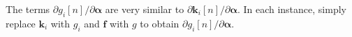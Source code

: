 \documentclass[onecolumn,11pt]{article}
\newcommand{\bs}{\boldsymbol}
\begin{document}
The terms $  {\partial g_i[n]}/{\partial \bs \alpha}$ are very similar to $  {\partial \bs k_i[n]}/{\partial \bs \alpha}$. In each instance, simply replace $\bs k_i$ with $g_i$ and $\bs f$ with $g$ to obtain $  {\partial g_i[n]}/{\partial \bs \alpha}$.



    
\end{document}
